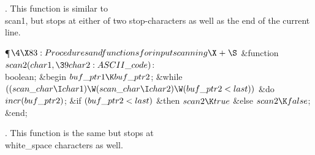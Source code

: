 .
This function is similar to \\{scan1}, but stops at either of two
stop-characters as well as the end of the current line.

\Y\P$\4\X83:Procedures and functions for input scanning\X\mathrel{+}\S$\6
\4\&{function}\1\  $\\{scan2}(\\{char1},\39\\{char2}:\\{ASCII\_code})$: %
\\{boolean};\2\6
\&{begin} $\\{buf\_ptr1}\K\\{buf\_ptr2}$;\6
\&{while} $((\\{scan\_char}\I\\{char1})\W(\\{scan\_char}\I\\{char2})\W(\\{buf%
\_ptr2}<\\{last}))$ \1\&{do}\5
$\\{incr}(\\{buf\_ptr2})$;\2\6
\&{if} $(\\{buf\_ptr2}<\\{last})$ \1\&{then}\5
$\\{scan2}\K\\{true}$\6
\4\&{else} $\\{scan2}\K\\{false}$;\2\6
\&{end};\par
\fi

.
This function is the same but stops at \\{white\_space} characters as well.

